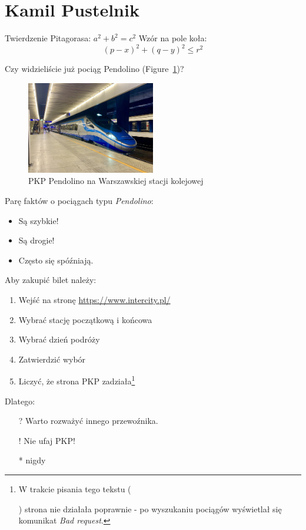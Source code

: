 \section{Kamil Pustelnik}
\label{sec:kpust}

Twierdzenie Pitagorasa: $a^2 + b^2 = c^2$
Wzór na pole koła: \[(p - x)^2 + (q - y)^2 \leq r^2\]

Czy widzieliście już pociąg Pendolino (Figure~\ref{fig:pendolino})?

\begin{figure}[htbp]
    \centering
    \includegraphics[width=0.5\textwidth]{pictures/Pendolino.jpg}
    \caption{PKP Pendolino na Warszawskiej stacji kolejowej}
    \label{fig:pendolino}
\end{figure}

Parę faktów o pociągach typu \emph{Pendolino}:
\begin{itemize}
    \item Są szybkie!
    \item Są drogie!
    \item Często się spóźniają.
\end{itemize}

Aby zakupić bilet należy:
\begin{enumerate}
    \item Wejść na stronę \url{https://www.intercity.pl/}
    \item Wybrać stację początkową i końcowa
    \item Wybrać dzień podróży
    \item Zatwierdzić wybór
    \item Liczyć, że strona PKP zadziała\footnote{W trakcie pisania tego tekstu (\date{25.10.2023}) strona nie działała poprawnie - po wyszukaniu pociągów wyświetlał się komunikat \emph{Bad request}.}
\end{enumerate}

Dlatego:
\begin{itemize}
    \item[?] Warto rozważyć innego przewoźnika.
    \item[!] Nie ufaj PKP!
    \item[*] nigdy
\end{itemize}

